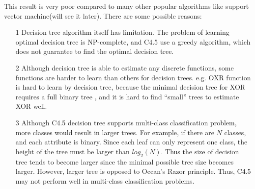 \documentclass[a4paper,11pt]{article}
\begin{document}
This result is very poor compared to many other popular algorithms like support vector machine(will see it later). There are some possible reasons:\\
\begin{enumerate}
\item[1] Decision tree algorithm itself has limitation. The problem of learning optimal decision tree is NP-complete\cite{dtnpc}, and C4.5 use a greedy algorithm, which does not guarantee to find the optimal decision tree.
\item[2] Although decision tree is able to estimate any discrete functions, some functions are harder to learn than others for decision trees. e.g. OXR function is hard to learn by decision tree, because the minimal decision tree for XOR requires a full binary tree , and it is hard to find ``small'' trees to estimate XOR well.
\item[3] Although C4.5 decision tree supports multi-class classification problem, more classes would result in larger trees. For example, if there are $N$ classes, and each attribute is binary. Since each leaf can only represent one class, the height of the tree must be larger than $log_2(N)$. Thus the size of decision tree tends to become larger since the minimal possible tree size becomes larger. However, larger tree is opposed to Occan's Razor principle. Thus, C4.5 may not perform well in multi-class classification problems.
\end{enumerate}
\end{document}
